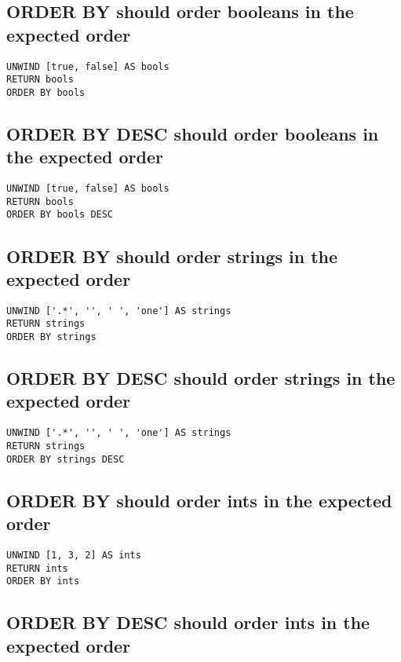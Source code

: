 \subsection{ORDER BY should order booleans in the expected order}

\begin{lstlisting}
UNWIND [true, false] AS bools
RETURN bools
ORDER BY bools
\end{lstlisting}

\subsection{ORDER BY DESC should order booleans in the expected order}

\begin{lstlisting}
UNWIND [true, false] AS bools
RETURN bools
ORDER BY bools DESC
\end{lstlisting}

\subsection{ORDER BY should order strings in the expected order}

\begin{lstlisting}
UNWIND ['.*', '', ' ', 'one'] AS strings
RETURN strings
ORDER BY strings
\end{lstlisting}

\subsection{ORDER BY DESC should order strings in the expected order}

\begin{lstlisting}
UNWIND ['.*', '', ' ', 'one'] AS strings
RETURN strings
ORDER BY strings DESC
\end{lstlisting}

\subsection{ORDER BY should order ints in the expected order}

\begin{lstlisting}
UNWIND [1, 3, 2] AS ints
RETURN ints
ORDER BY ints
\end{lstlisting}

\subsection{ORDER BY DESC should order ints in the expected order}


